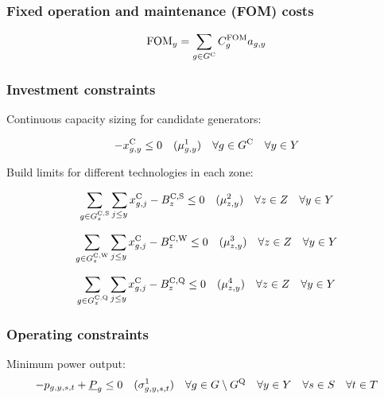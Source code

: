 \documentclass{article}
\newcommand{\sScenarioSets}{\quad \forall \iYear \in \sYears \quad \forall \iScenario \in \sScenarios \quad \forall \iInterval \in \sIntervals}
\begin{document}
\subsubsection{Fixed operation and maintenance (FOM) costs}
\begin{equation}
\cFixedOperationsMaintenanceCost = \sum\limits_{\iGenerator \in \sGeneratorsCandidate} \cFixedOperationsMaintenanceCostGenerator \vInstalledCapacityTotal
\end{equation}


\subsubsection{Investment constraints}
Continuous capacity sizing for candidate generators:

\begin{equation}
	- \vInstalledCapacity[\iGenerator,\iYear] \leq 0 \quad (\dNonNegativeCandidateCapacity) \quad \forall \iGenerator \in \sGeneratorsCandidate \quad \forall \iYear \in \sYears
\end{equation}

Build limits for different technologies in each zone:

\begin{equation}
\sum\limits_{\iGenerator \in \sGeneratorsCandidateSolar_{\iZone}} \sum\limits_{\iYearAlias \leq \iYear} \vInstalledCapacity[\iGenerator,\iYearAlias] - \cBuildLimitSolar \leq 0 \quad (\dSolarBuildLimit) \quad \forall \iZone \in \sZones \quad \forall \iYear \in \sYears
\end{equation}

\begin{equation}
\sum\limits_{\iGenerator \in \sGeneratorsCandidateWind_{\iZone}} \sum\limits_{\iYearAlias \leq \iYear} \vInstalledCapacity[\iGenerator,\iYearAlias] - \cBuildLimitWind \leq 0 \quad (\dWindBuildLimit) \quad \forall \iZone \in \sZones \quad \forall \iYear \in \sYears 
\end{equation}

\begin{equation}
	\sum\limits_{\iGenerator \in \sStorageCandidate_{\iZone}}  \sum\limits_{\iYearAlias \leq \iYear} \vInstalledCapacity[\iGenerator,\iYearAlias] - \cBuildLimitStorage \leq 0  \quad (\dStorageBuildLimit) \quad \forall \iZone \in \sZones \quad \forall \iYear \in \sYears
\end{equation}

\subsubsection{Operating constraints}
Minimum power output:
\begin{equation}
	-\vPower + \cPowerOutputMin \leq 0 \quad (\dMinPowerOutput) \quad \forall \iGenerator \in \sGenerators \setminus \sStorage \sScenarioSets
\end{equation}
\end{document}
